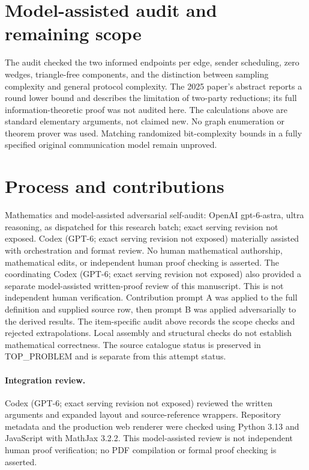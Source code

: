\documentclass[11pt]{article}
\begin{document}
\section{Model-assisted audit and remaining scope}
The audit checked the two informed endpoints per edge, sender scheduling,
zero wedges, triangle-free components, and the distinction between
sampling complexity and general protocol complexity. The 2025 paper's
abstract reports a round lower bound and describes the limitation of
two-party reductions; its full information-theoretic proof was not
audited here. The calculations above are standard elementary arguments,
not claimed new. No graph enumeration or theorem prover was used.
Matching randomized bit-complexity bounds in a fully specified original
communication model remain unproved.

\section{Process and contributions}
Mathematics and model-assisted adversarial self-audit: OpenAI gpt-6-astra, ultra reasoning, as dispatched for this research batch; exact serving revision not exposed. Codex (GPT-6; exact serving revision not exposed) materially assisted with orchestration and format review. No human mathematical authorship, mathematical edits, or independent human proof checking is asserted.
The coordinating Codex (GPT-6; exact serving revision not exposed) also provided a separate model-assisted written-proof review of this manuscript. This is not independent human verification.
Contribution prompt A was applied to the full definition and supplied source row, then prompt B was applied adversarially to the derived results. The item-specific audit above records the scope checks and rejected extrapolations. Local assembly and structural checks do not establish mathematical correctness. The source catalogue status is preserved in TOP\_PROBLEM and is separate from this attempt status.
\paragraph{Integration review.} Codex (GPT-6; exact serving revision not exposed) reviewed the written arguments and expanded layout and source-reference wrappers. Repository metadata and the production web renderer were checked using Python 3.13 and JavaScript with MathJax 3.2.2. This model-assisted review is not independent human proof verification; no PDF compilation or formal proof checking is asserted.
\end{document}
